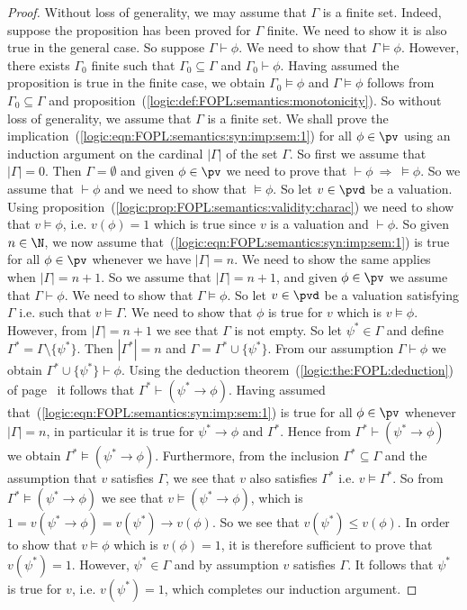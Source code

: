 \begin{proof}
Without loss of generality, we may assume that $\Gamma$ is a finite
set. Indeed, suppose the proposition has been proved for $\Gamma$
finite. We need to show it is also true in the general case. So
suppose $\Gamma\vdash\phi$. We need to show that $\Gamma\vDash\phi$.
However, there exists $\Gamma_{0}$ finite such that
$\Gamma_{0}\subseteq\Gamma$ and $\Gamma_{0}\vdash\phi$. Having
assumed the proposition is true in the finite case, we obtain
$\Gamma_{0}\vDash\phi$ and $\Gamma\vDash\phi$ follows from
$\Gamma_{0}\subseteq\Gamma$ and
proposition~(\ref{logic:def:FOPL:semantics:monotonicity}). So
without loss of generality, we assume that $\Gamma$ is a finite set.
We shall prove the
implication~(\ref{logic:eqn:FOPL:semantics:syn:imp:sem:1}) for all
$\phi\in\pv$ using an induction argument on the cardinal $|\Gamma|$
of the set $\Gamma$. So first we assume that $|\Gamma|=0$. Then
$\Gamma=\emptyset$ and given $\phi\in\pv$ we need to prove that
$\vdash\phi\ \Rightarrow\ \vDash\phi$. So we assume that
$\vdash\phi$ and we need to show that $\vDash\phi$. So let
$v\in\pvd$ be a valuation. Using
proposition~(\ref{logic:prop:FOPL:semantics:validity:charac}) we
need to show that $v\vDash\phi$, i.e. $v(\phi)=1$ which is true
since $v$ is a valuation and $\vdash\phi$. So given $n\in\N$, we now
assume that~(\ref{logic:eqn:FOPL:semantics:syn:imp:sem:1}) is true
for all $\phi\in\pv$ whenever we have $|\Gamma|=n$. We need to show
the same applies when $|\Gamma|=n+1$. So we assume that
$|\Gamma|=n+1$, and given $\phi\in\pv$ we assume that
$\Gamma\vdash\phi$. We need to show that $\Gamma\vDash\phi$. So let
$v\in\pvd$ be a valuation satisfying $\Gamma$ i.e. such that
$v\vDash\Gamma$. We need to show that $\phi$ is true for $v$ which
is $v\vDash\phi$. However, from $|\Gamma|=n+1$ we see that $\Gamma$
is not empty. So let $\psi^{*}\in\Gamma$ and define
$\Gamma^{*}=\Gamma\setminus\{\psi^{*}\}$. Then $|\Gamma^{*}|=n$ and
$\Gamma=\Gamma^{*}\cup\{\psi^{*}\}$. From our assumption
$\Gamma\vdash\phi$ we obtain $\Gamma^{*}\cup\{\psi^{*}\}\vdash\phi$.
Using the deduction theorem~(\ref{logic:the:FOPL:deduction}) of
page~\pageref{logic:the:FOPL:deduction} it follows that
$\Gamma^{*}\vdash(\psi^{*}\to\phi)$. Having assumed
that~(\ref{logic:eqn:FOPL:semantics:syn:imp:sem:1}) is true for all
$\phi\in\pv$ whenever $|\Gamma|=n$, in particular it is true for
$\psi^{*}\to\phi$ and $\Gamma^{*}$. Hence from
$\Gamma^{*}\vdash(\psi^{*}\to\phi)$ we obtain
$\Gamma^{*}\vDash(\psi^{*}\to\phi)$. Furthermore, from the inclusion
$\Gamma^{*}\subseteq\Gamma$ and the assumption that $v$ satisfies
$\Gamma$, we see that $v$ also satisfies $\Gamma^{*}$ i.e.
$v\vDash\Gamma^{*}$. So from $\Gamma^{*}\vDash(\psi^{*}\to\phi)$ we
see that $v\vDash(\psi^{*}\to\phi)$, which is
$1=v(\psi^{*}\to\phi)=v(\psi^{*})\to v(\phi)$. So we see that
$v(\psi^{*})\leq v(\phi)$. In order to show that $v\vDash\phi$ which
is $v(\phi)=1$, it is therefore sufficient to prove that
$v(\psi^{*})=1$. However, $\psi^{*}\in\Gamma$ and by assumption $v$
satisfies $\Gamma$. It follows that $\psi^{*}$ is true for $v$, i.e.
$v(\psi^{*})=1$, which completes our induction argument.
\end{proof}
